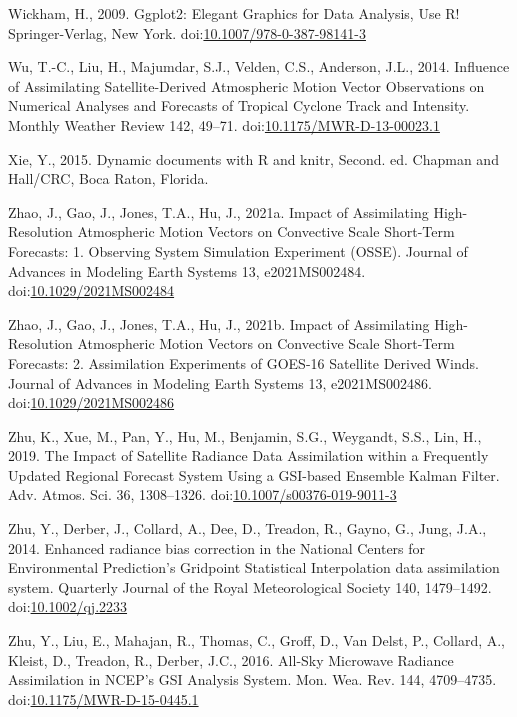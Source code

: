 \documentclass[final,5p,times,twocolumn,authoryear]{elsarticle} %
\begin{document}
\leavevmode\hypertarget{ref-wickham2009}{}%
Wickham, H., 2009. Ggplot2: Elegant Graphics for Data Analysis, Use R! Springer-Verlag, New York. doi:\href{https://doi.org/10.1007/978-0-387-98141-3}{10.1007/978-0-387-98141-3}

\leavevmode\hypertarget{ref-wu2014}{}%
Wu, T.-C., Liu, H., Majumdar, S.J., Velden, C.S., Anderson, J.L., 2014. Influence of Assimilating Satellite-Derived Atmospheric Motion Vector Observations on Numerical Analyses and Forecasts of Tropical Cyclone Track and Intensity. Monthly Weather Review 142, 49--71. doi:\href{https://doi.org/10.1175/MWR-D-13-00023.1}{10.1175/MWR-D-13-00023.1}

\leavevmode\hypertarget{ref-xie2015}{}%
Xie, Y., 2015. Dynamic documents with R and knitr, Second. ed. Chapman and Hall/CRC, Boca Raton, Florida.

\leavevmode\hypertarget{ref-zhao2021}{}%
Zhao, J., Gao, J., Jones, T.A., Hu, J., 2021a. Impact of Assimilating High-Resolution Atmospheric Motion Vectors on Convective Scale Short-Term Forecasts: 1. Observing System Simulation Experiment (OSSE). Journal of Advances in Modeling Earth Systems 13, e2021MS002484. doi:\href{https://doi.org/10.1029/2021MS002484}{10.1029/2021MS002484}

\leavevmode\hypertarget{ref-zhao2021a}{}%
Zhao, J., Gao, J., Jones, T.A., Hu, J., 2021b. Impact of Assimilating High-Resolution Atmospheric Motion Vectors on Convective Scale Short-Term Forecasts: 2. Assimilation Experiments of GOES-16 Satellite Derived Winds. Journal of Advances in Modeling Earth Systems 13, e2021MS002486. doi:\href{https://doi.org/10.1029/2021MS002486}{10.1029/2021MS002486}

\leavevmode\hypertarget{ref-zhu2019}{}%
Zhu, K., Xue, M., Pan, Y., Hu, M., Benjamin, S.G., Weygandt, S.S., Lin, H., 2019. The Impact of Satellite Radiance Data Assimilation within a Frequently Updated Regional Forecast System Using a GSI-based Ensemble Kalman Filter. Adv. Atmos. Sci. 36, 1308--1326. doi:\href{https://doi.org/10.1007/s00376-019-9011-3}{10.1007/s00376-019-9011-3}

\leavevmode\hypertarget{ref-zhu2014}{}%
Zhu, Y., Derber, J., Collard, A., Dee, D., Treadon, R., Gayno, G., Jung, J.A., 2014. Enhanced radiance bias correction in the National Centers for Environmental Prediction's Gridpoint Statistical Interpolation data assimilation system. Quarterly Journal of the Royal Meteorological Society 140, 1479--1492. doi:\href{https://doi.org/10.1002/qj.2233}{10.1002/qj.2233}

\leavevmode\hypertarget{ref-zhu2016}{}%
Zhu, Y., Liu, E., Mahajan, R., Thomas, C., Groff, D., Van Delst, P., Collard, A., Kleist, D., Treadon, R., Derber, J.C., 2016. All-Sky Microwave Radiance Assimilation in NCEP's GSI Analysis System. Mon. Wea. Rev. 144, 4709--4735. doi:\href{https://doi.org/10.1175/MWR-D-15-0445.1}{10.1175/MWR-D-15-0445.1}
\end{document}
